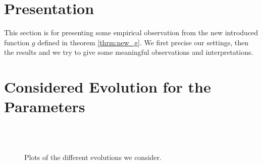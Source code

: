 \documentclass[11pt]{book}
\begin{document}
\section{Presentation}
This section is for presenting some empirical observation from the new introduced function $g$ defined in theorem \ref{thrm:new_g}. We first precise our settings, then the results and we try to give some meaningful observations and interpretations.

\section{Considered Evolution for the Parameters}
\begin{figure}
\centering
{}
\\
\\
\caption{Plots of the different evolutions we consider.}
\label{fig:evol_functions}
\end{figure}
\end{document}
